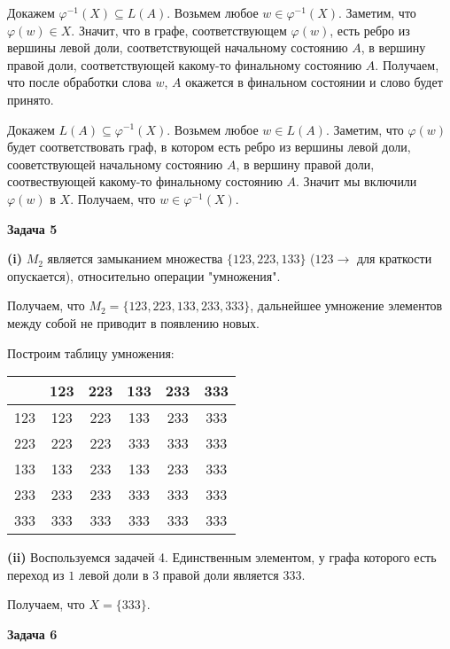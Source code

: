 \documentclass[10pt]{article}
\begin{document}
Докажем $\varphi^{-1}(X) \subseteq L(A)$.
Возьмем любое $w \in \varphi^{-1}(X)$.
Заметим, что $\varphi(w) \in X$.
Значит, что в графе, соответствующем $\varphi(w)$, есть ребро из вершины левой доли, соответствующей начальному состоянию $A$, в вершину правой доли, соответствующей какому-то финальному состоянию $A$.
Получаем, что после обработки слова $w$, $A$ окажется в финальном состоянии и слово будет принято.

Докажем $L(A) \subseteq \varphi^{-1}(X)$.
Возьмем любое $w \in L(A)$.
Заметим, что $\varphi(w)$ будет соответствовать граф, в котором есть ребро из вершины левой доли, сооветствующей начальному состоянию $A$, в вершину правой доли, соотвествующей какому-то финальному состоянию $A$.
Значит мы включили $\varphi(w)$ в $X$.
Получаем, что $w \in \varphi^{-1}(X)$.

\medskip

{\bf Задача 5}

{\bf (i)}
$M_2$ является замыканием множества $\{ 123, 223, 133 \}$ ($123 \rightarrow$ для краткости опускается), относительно операции "умножения".

Получаем, что $M_2 = \{ 123, 223, 133, 233, 333 \}$, дальнейшее умножение элементов между собой не приводит в появлению новых.

Построим таблицу умножения:

\begin{center}
\begin{tabular}{|c||c|c|c|c|c|}
  \hline
  & 123 & 223 & 133 & 233 & 333 \\
  \hline
  \hline
  123 & 123 & 223 & 133 & 233 & 333 \\
  \hline
  223 & 223 & 223 & 333 & 333 & 333 \\
  \hline
  133 & 133 & 233 & 133 & 233 & 333 \\
  \hline
  233 & 233 & 233 & 333 & 333 & 333 \\
  \hline
  333 & 333 & 333 & 333 & 333 & 333 \\
  \hline
\end{tabular}
\end{center}

\smallskip

{\bf (ii)}
Воспользуемся задачей 4. Единственным элементом, у графа которого есть переход из $1$ левой доли в $3$ правой доли является $333$.

Получаем, что $X = \{ 333 \}$.

\medskip

{\bf Задача 6}
\end{document}
